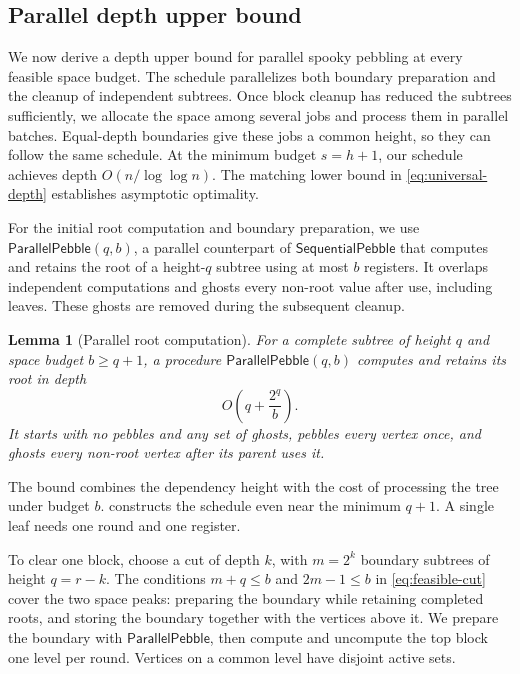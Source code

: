 \documentclass[11pt]{article}
\newtheorem{lemma}[lemma]{Lemma}
\theoremstyle{definition}
\theoremstyle{remark}
\newcommand{\Fast}{\mathsf{SequentialPebble}}
\newcommand{\Sweep}{\mathsf{ParallelPebble}}
\begin{document}
\subsection{Parallel depth upper bound}
\label{sec:parallel-upper}

We now derive a depth upper bound for parallel spooky pebbling at every feasible space budget. The schedule parallelizes both boundary preparation and the cleanup of independent subtrees. Once block cleanup has reduced the subtrees sufficiently, we allocate the space among several jobs and process them in parallel batches. Equal-depth boundaries give these jobs a common height, so they can follow the same schedule.
At the minimum budget $s=h+1$, our schedule achieves depth $O(n/\log\log n)$. The matching lower bound in \cref{eq:universal-depth} establishes asymptotic optimality.

For the initial root computation and boundary preparation, we use $\Sweep(q,b)$, a parallel counterpart of $\Fast$ that computes and retains the root of a height-$q$ subtree using at most $b$ registers. It overlaps independent computations and ghosts every non-root value after use, including leaves. These ghosts are removed during the subsequent cleanup.

\begin{lemma}[Parallel root computation]
\label{lem:sweep}
For a complete subtree of height $q$ and space budget $b\ge q+1$, a procedure $\Sweep(q,b)$ computes and retains its root in depth
\begin{equation}
O\!\left(q+\frac{2^q}{b}\right).
\label{eq:sweep}
\end{equation}
It starts with no pebbles and any set of ghosts, pebbles every vertex once, and ghosts every non-root vertex after its parent uses it.
\end{lemma}

The bound combines the dependency height with the cost of processing the tree under budget $b$.  constructs the schedule even near the minimum $q+1$. A single leaf needs one round and one register.

To clear one block, choose a cut of depth $k$, with $m=2^k$ boundary subtrees of height $q=r-k$. The conditions $m+q\le b$ and $2m-1\le b$ in \cref{eq:feasible-cut} cover the two space peaks: preparing the boundary while retaining completed roots, and storing the boundary together with the vertices above it. We prepare the boundary with $\Sweep$, then compute and uncompute the top block one level per round. Vertices on a common level have disjoint active sets.
\end{document}
